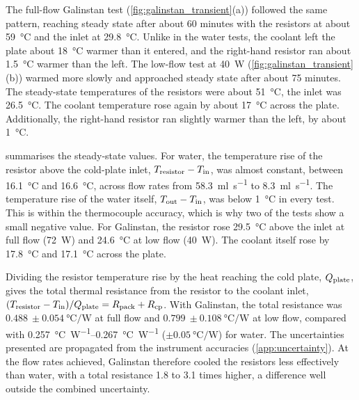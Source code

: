 The full-flow Galinstan test (\cref{fig:galinstan_transient}(a)) followed the same
pattern, reaching steady state after about 60 minutes with the resistors at
about \SI{59}{\celsius} and the inlet at \SI{29.8}{\celsius}. Unlike in the
water tests, the coolant left the plate about \SI{18}{\celsius} warmer than it
entered, and the right-hand resistor ran about \SI{1.5}{\celsius} warmer than the
left. The low-flow test at \SI{40}{\watt} (\cref{fig:galinstan_transient}(b))
warmed more slowly and approached steady state after about 75 minutes. The steady-state temperatures of the
resistors were about \SI{51}{\celsius}, the inlet was \SI{26.5}{\celsius}.
The coolant temperature rose again by about \SI{17}{\celsius} across the plate. 
Additionally, the right-hand
resistor ran slightly warmer than the left, by about \SI{1}{\celsius}.

 summarises the steady-state values. For water,
the temperature rise of the resistor above the cold-plate inlet,
$T_{\mathrm{resistor}} - T_{\mathrm{in}}$, was almost constant, between \SI{16.1}{\celsius} and
\SI{16.6}{\celsius}, across flow rates from \SI{58.3}{\milli\litre\per\second}
to \SI{8.3}{\milli\litre\per\second}. The temperature rise of the water itself,
$T_{\mathrm{out}} - T_{\mathrm{in}}$, was below \SI{1}{\celsius} in every test. This is within the
thermocouple accuracy, which is why two of the tests show a small negative
value. For Galinstan, the resistor rose \SI{29.5}{\celsius} above the inlet at
full flow (\SI{72}{\watt}) and \SI{24.6}{\celsius} at low flow (\SI{40}{\watt}).
The coolant itself rose by \SI{17.8}{\celsius} and \SI{17.1}{\celsius}
across the plate.

Dividing the resistor temperature rise by the heat reaching the cold plate,
$Q_{\mathrm{plate}}$, gives the total thermal resistance from the resistor to the coolant
inlet, $(T_{\mathrm{resistor}} - T_{\mathrm{in}})/Q_{\mathrm{plate}} = R_{\mathrm{pack}} + R_{\mathrm{cp}}$. With Galinstan, the total
resistance was $\SI{0.488}{} \pm \SI{0.054}{\celsius\per\watt}$ at full flow and
$\SI{0.799}{} \pm \SI{0.108}{\celsius\per\watt}$ at low flow, compared with
\SIrange{0.257}{0.267}{\celsius\per\watt} ($\pm\SI{0.05}{\celsius\per\watt}$)
for water. The uncertainties presented are propagated from the instrument accuracies
(\cref{app:uncertainty}). At the flow rates achieved, Galinstan therefore cooled
the resistors less effectively than water, with a total resistance 1.8 to 3.1
times higher, a difference well outside the combined uncertainty.

